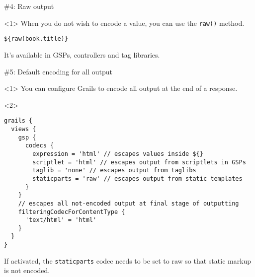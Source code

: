 \begin{frame}

    \begin{center}
      \Huge \#4: Raw output
    \end{center}

    \vspace{1cm}

    \begin{onlyenv}<1>
      When you do not wish to encode a value, you can use the \verb|raw()| method.
      \begin{center}
        \begin{minipage}{\textwidth}
          \begin{verbatim}
${raw(book.title)}
          \end{verbatim}
        \end{minipage}
      \end{center}

      It's available in GSPs, controllers and tag libraries.
    \end{onlyenv}

\end{frame}



\begin{frame}

    \begin{center}
      \Huge \#5: Default encoding for all output
    \end{center}

    \vspace{1cm}

    \begin{onlyenv}<1>
      You can configure Grails to encode all output at the end of a response.
    \end{onlyenv}

    \begin{onlyenv}<2>
      \begin{center}
        \begin{minipage}{1.1\textwidth}
          \begin{verbatim}
grails {
  views {
    gsp {
      codecs {
        expression = 'html' // escapes values inside ${}
        scriptlet = 'html' // escapes output from scriptlets in GSPs
        taglib = 'none' // escapes output from taglibs
        staticparts = 'raw' // escapes output from static templates
      }
    }
    // escapes all not-encoded output at final stage of outputting
    filteringCodecForContentType {
      'text/html' = 'html'
    }
  }
}
          \end{verbatim}
        \end{minipage}
      \end{center}

      If activated, the \verb|staticparts| codec needs to be set to raw so
      that static markup is not encoded.
    \end{onlyenv}

\end{frame}
